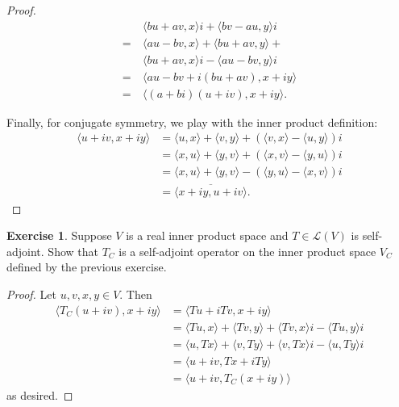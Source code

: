 \documentclass{article}
\theoremstyle{definition}
\newtheorem{ex}{Exercise}
\begin{document}
\begin{proof}
\begin{align*}
		                                            & \langle bu + av, x \rangle i + \langle bv - au, y \rangle i                                         \\
		=\                                          & \langle au - bv, x \rangle + \langle bu + av, y \rangle +                                           \\
		                                            & \langle bu + av, x \rangle i - \langle au - bv, y \rangle i                                         \\
		=\                                          & \langle au - bv + i(bu + av), x + iy \rangle                                                        \\
		=\                                          & \langle (a + bi)(u + iv), x + iy \rangle.
	\end{align*}

	Finally, for conjugate symmetry, we play with the inner product definition: \begin{align*}
		\langle u + iv, x + iy \rangle & = \langle u, x \rangle + \langle v, y \rangle + \left( \langle v, x \rangle - \langle u, y \rangle \right)i \\
		                               & = \langle x, u \rangle + \langle y, v \rangle + \left( \langle x, v \rangle - \langle y, u \rangle \right)i \\
		                               & = \langle x, u \rangle + \langle y, v \rangle - \left( \langle y, u \rangle - \langle x, v \rangle \right)i \\
		                               & = \overline{\langle x + iy, u + iv \rangle}.
	\end{align*}
\end{proof}

\begin{ex}
	Suppose $V$ is a real inner product space and $T \in \mathcal{L}(V)$ is self-adjoint.
	Show that $T_C$ is a self-adjoint operator on the inner product space $V_C$ defined by the previous exercise.
\end{ex}
\begin{proof}
	Let $u, v, x, y \in V$.
	Then \begin{align*}
		\langle T_C(u + iv), x + iy \rangle & = \langle Tu + iTv, x + iy \rangle                                                                  \\
		                                    & = \langle Tu, x \rangle + \langle Tv, y \rangle + \langle Tv, x \rangle i - \langle Tu, y \rangle i \\
		                                    & = \langle u, Tx \rangle + \langle v, Ty \rangle + \langle v, Tx \rangle i - \langle u, Ty \rangle i \\
		                                    & = \langle u + iv, Tx + iTy \rangle                                                                  \\
		                                    & = \langle u + iv, T_C(x + iy) \rangle
	\end{align*} as desired.
\end{proof}
\end{document}
